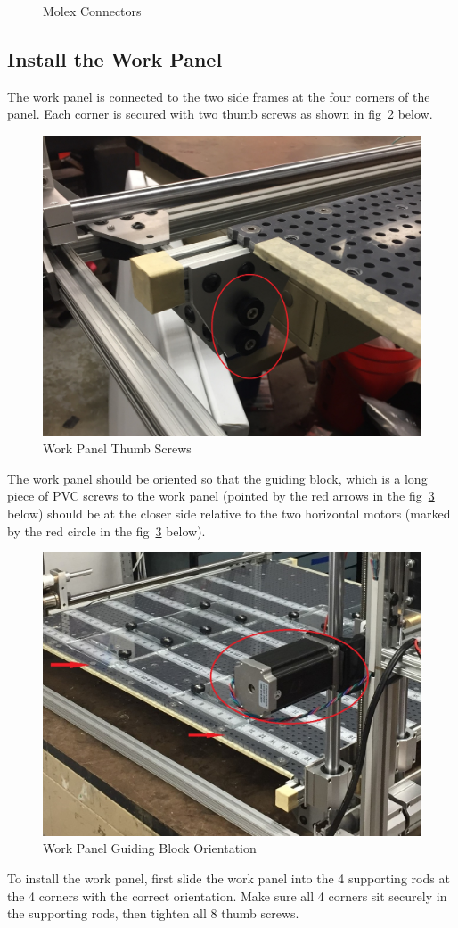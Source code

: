\documentclass[titlepage,12pt,letter]{report}
\numberwithin{equation}{chapter}
\begin{document}
\begin{figure}[H]
\begin{minipage}[b]{0.3 \linewidth}
	\end{minipage}
	\caption{Molex Connectors}
	\label{fig:molex}
\end{figure}

\subsection{Install the Work Panel}
The work panel is connected to the two side frames at the four corners of the panel. Each corner is secured with two thumb screws as shown in fig~\ref{fig:panel} below. 
\begin{figure} [H]
	\includegraphics[width = 0.8\linewidth]{./Figures/panel_thumb_screw.jpg}
	\caption{Work Panel Thumb Screws}
	\label{fig:panel}
\end{figure}
The work panel should be oriented so that the guiding block, which is a long piece of PVC screws to the work panel (pointed by the red arrows in the fig~\ref{fig:panel2} below) should be at the closer side relative to the two horizontal motors (marked by the red circle in the fig~\ref{fig:panel2} below).
\begin{figure} [H]
	\includegraphics[width = 0.8\linewidth]{./Figures/panel.jpg}
	\caption{Work Panel Guiding Block Orientation }
	\label{fig:panel2}
\end{figure}
To install the work panel, first slide the work panel into the 4 supporting rods at the 4 corners with the correct orientation. Make sure all 4 corners sit securely in the supporting rods, then tighten all 8 thumb screws.
\end{document}
